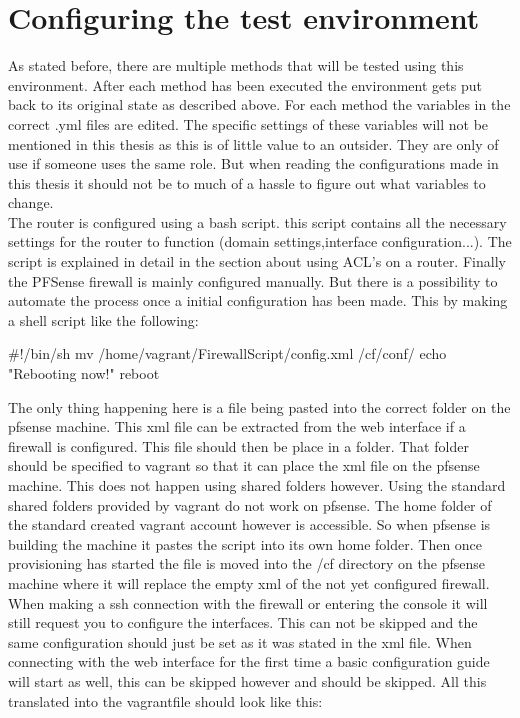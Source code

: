 \section {Configuring the test environment}
As stated before, there are multiple methods that will be tested using this environment. After each method has been executed the environment gets put back to its original state as described above. For each method the variables in the correct .yml files are edited. The specific settings of these variables will not be mentioned in this thesis as this is of little value to an outsider. They are only of use if someone uses the same role. But when reading the configurations made in this thesis it should not be to much of a hassle to figure out what variables to change.\\
The router is configured using a bash script. this script contains all the necessary settings for the router to function (domain settings,interface configuration...). The script is explained in detail in the section about using ACL's on a router. Finally the PFSense firewall is mainly configured manually. But there is a possibility to automate the process once a initial configuration has been made. This by making a shell script like the following:
\begin{cisco}[title=PFSense script]
#!/bin/sh
mv /home/vagrant/FirewallScript/config.xml /cf/conf/
echo "Rebooting now!"
reboot
\end{cisco}
The only thing happening here is a file being pasted into the correct folder on the pfsense machine. This xml file can be extracted from the web interface if a firewall is configured. This file should then be place in a folder. That folder should be specified to vagrant so that it can place the xml file on the pfsense machine. This does not happen using shared folders however. Using the standard shared folders provided by vagrant do not work on pfsense. The home folder of the standard created vagrant account however is accessible. So when pfsense is building the machine it pastes the script into its own home folder. Then once provisioning has started the file is moved into the /cf directory on the pfsense machine where it will replace the empty xml of the not yet configured firewall. When making a ssh connection with the firewall or entering the console it will still request you to configure the interfaces. This can not be skipped and the same configuration should just be set as it was stated in the xml file. When connecting with the web interface for the first time a basic configuration guide will start as well, this can be skipped however and should be skipped. All this translated into the vagrantfile should look like this:
